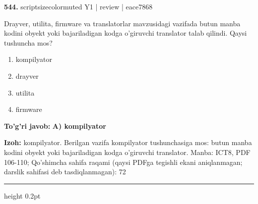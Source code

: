 \documentclass[10pt,a4paper]{article}
\begin{document}
{\bfseries\sffamily\color{ink} 544.} {scriptsizecolor{muted} Y1 | review | eace7868}
\par
Drayver, utilita, firmware va translatorlar mavzusidagi vazifada butun manba kodini obyekt yoki bajariladigan kodga o'giruvchi translator talab qilindi. Qaysi tushuncha mos?
\begin{enumerate}[label=\Alph*),leftmargin=9mm]
\item kompilyator
\item drayver
\item utilita
\item firmware
\end{enumerate}
\begin{tcolorbox}[enhanced,breakable,colback=teal!4,colframe=teal!60!black,boxrule=0.45pt,arc=1.2mm,left=2.7mm,right=2.7mm,top=1.8mm,bottom=1.8mm,before skip=2mm,after skip=2mm]
{\bfseries\sffamily\color{teal}To'g'ri javob:} \textbf{A) kompilyator}
\par\smallskip
{\bfseries Izoh:} kompilyator. Berilgan vazifa kompilyator tushunchasiga mos: butun manba kodini obyekt yoki bajariladigan kodga o'giruvchi translator. Manba: ICT8, PDF 106-110; Qo'shimcha sahifa raqami (qaysi PDFga tegishli ekani aniqlanmagan; darslik sahifasi deb tasdiqlanmagan): 72
\end{tcolorbox}
\vspace{2mm}\hrule height 0.2pt\vspace{3mm}
\end{document}
